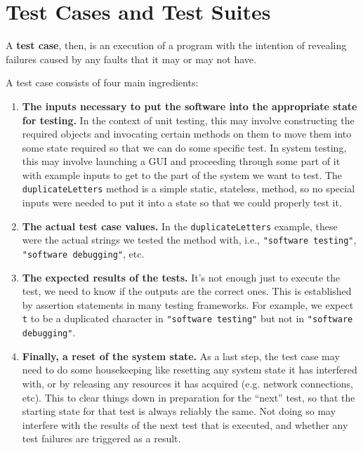 \section{Test Cases and Test Suites}

A {\bf test case}, then, is an execution of a program with the intention of
revealing failures caused by any faults that it may or may not have. 

A test case consists of four main ingredients:

\begin{enumerate}

    \item {\bf The inputs necessary to put the software into the appropriate
    state for testing.} 
    In the context of unit testing, this may involve constructing the required
    objects and invocating certain methods on them to move them into some state
    required so that we can do some specific test. In system testing, this may
    involve launching a GUI and proceeding through some part of it with example
    inputs to get to the part of the system we want to test. 
    The {\tt duplicateLetters} method is a simple static, stateless, method, so
    no special inputs were needed to put it into a state so that we could
    properly test it.

    \item {\bf The actual test case values.} 
    In the {\tt duplicateLetters} example, these were the actual strings we
    tested the method with, i.e., {\tt "software testing"}, {\tt "software
    debugging"}, etc.

    \item {\bf The expected results of the tests.}
    It's not enough just to execute the test, we need to know if the outputs are
    the correct ones. This is established by assertion statements in many
    testing frameworks. For example, we expect {\tt t} to be a duplicated
    character in {\tt "software testing"} but not in {\tt "software debugging"}.

    \item {\bf Finally, a reset of the system state.} 
    As a last step, the test case may need to do some housekeeping like
    resetting any system state it has interfered with, or by releasing any
    resources it has acquired (e.g. network connections, etc). This to clear
    things down in preparation for the ``next'' test, so that the starting state
    for that test is always reliably the same. Not doing so may interfere with
    the results of the next test that is executed, and whether any test failures
    are triggered as a result. 

\end{enumerate}    

